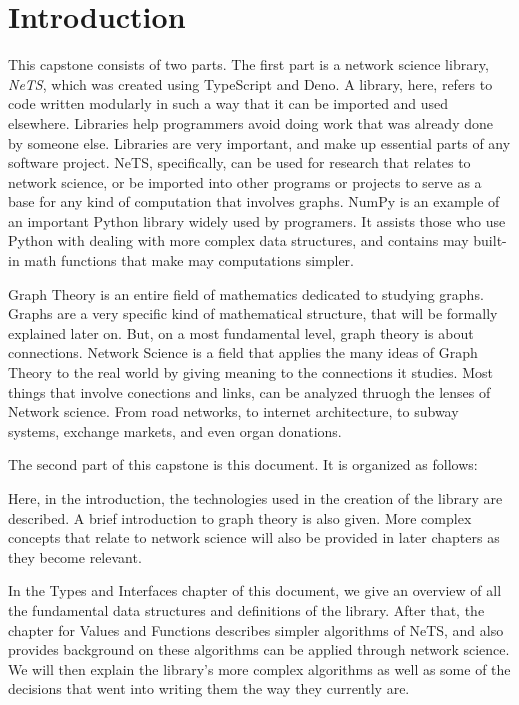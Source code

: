 \chapter{Introduction}

This capstone consists of two parts.
The first part is a network science library, \textit{NeTS},
which was created using TypeScript and Deno.
A library, here, refers to code written modularly in such a way that it can be imported and used elsewhere.
Libraries help programmers avoid doing work that was already done by someone else.
Libraries are very important, and make up essential parts of any software project.
NeTS, specifically, can be used for research that relates to network science,
or be imported into other programs or projects to serve as a base for any
kind of computation that involves graphs.
NumPy is an example of an important Python library widely used by programers.
It assists those who use Python with dealing with more complex data structures,
and contains may built-in math functions that make may computations simpler.

Graph Theory is an entire field of mathematics dedicated to studying graphs.
Graphs are a very specific kind of mathematical structure,
that will be formally explained later on.
But, on a most fundamental level, graph theory is about connections.
Network Science is a field that applies the many ideas of Graph Theory to the real world
by giving meaning to the connections it studies.
Most things that involve conections and links,
can be analyzed thruogh the lenses of Network science.
From road networks, to internet architecture, to subway systems, exchange markets, and even organ donations.

The second part of this capstone is this document. It is organized as follows:

Here, in the introduction, the technologies used in the creation of the library are described.
A brief introduction to graph theory is also given.
More complex concepts that relate to network science will also be
provided in later chapters as they become relevant.

In the Types and Interfaces chapter of this document, we give an overview of all the fundamental
data structures and definitions of the library.
After that, the chapter for Values and Functions describes simpler algorithms
of NeTS, and also provides background on these algorithms can be applied through network science.
We will then explain the library's more complex algorithms as well as some of the
decisions that went into writing them the way they currently are.

